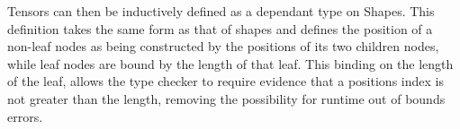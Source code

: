 \begin{AgdaAlign}
\begin{code}[hide]%
%
\>[2]\<%
\\
\>[2][@{}l@{\AgdaIndent{0}}]%
\>[4]\<%
\\
\>[4][@{}l@{\AgdaIndent{0}}]%
\>[6]\AgdaSpace{}%
\AgdaSpace{}%
\AgdaSymbol{:}\AgdaSpace{}%
\<%
\\
%
\>[2]\AgdaSpace{}%
\AgdaSymbol{:}\AgdaSpace{}%
\AgdaSpace{}%
\AgdaSpace{}%
\AgdaSpace{}%
\AgdaSpace{}%
\AgdaSpace{}%
\AgdaSpace{}%
\AgdaSpace{}%
\AgdaSpace{}%
\<%
\\
%
\>[2]\AgdaSpace{}%
\AgdaSpace{}%
\AgdaSpace{}%
\AgdaSpace{}%
\AgdaSpace{}%
\AgdaSymbol{=}\AgdaSpace{}%
\<%
\end{code}
\begin{code}%
\>[2][@{}l@{\AgdaIndent{1}}]%
\>[4]\AgdaSpace{}%
\AgdaSymbol{=}\AgdaSpace{}%
\AgdaSymbol{(}%
\>[12]%
\>[15]%
\>[18]\AgdaSymbol{)}\AgdaSpace{}%
\AgdaSpace{}%
\AgdaSymbol{(}\AgdaSpace{}%
\AgdaSpace{}%
\AgdaSymbol{)}\<%
\\
%
\>[4]\AgdaSpace{}%
\AgdaSymbol{=}%
\>[12]%
\>[15]\AgdaSpace{}%
\AgdaSymbol{(}%
\>[21]\AgdaSpace{}%
\AgdaSymbol{(}\AgdaSpace{}%
\AgdaSpace{}%
\AgdaSymbol{))}\<%
\end{code}
\begin{code}[hide]%
%
\>[4]\AgdaSpace{}%
\AgdaSpace{}%
\<%
\end{code}

Tensors can then be inductively defined as a dependant type on Shapes.
This definition takes the same form as that of shapes and defines the position 
of a non-leaf nodes as being constructed by the positions of its two children 
nodes, while leaf nodes are bound by the length of that leaf.
This binding on the length of the leaf, allows the type checker to require
evidence that a positions index is not greater than the length, removing the possibility
for runtime out of bounds errors.



\end{AgdaAlign}

